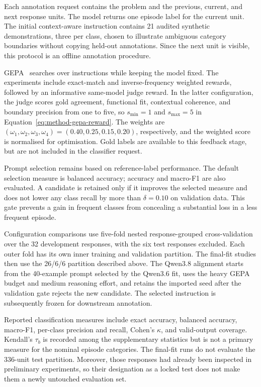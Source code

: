 \documentclass[12pt,a4paper,twoside,openright]{book}
\begin{document}
Each annotation request contains the problem and the previous, current, and
next response units. The model returns one episode label for the current
unit. The initial context-aware instruction contains 21 audited synthetic
demonstrations, three per class, chosen to illustrate ambiguous category
boundaries without copying held-out annotations. Since the next unit is
visible, this protocol is an offline annotation procedure.

GEPA~\cite{agrawal2026gepa} searches over instructions while keeping the model
fixed. The experiments include exact-match and
inverse-frequency weighted rewards, followed by an informative same-model
judge reward. In the latter configuration, the judge scores gold agreement,
functional fit, contextual coherence, and boundary precision from one to
five, so $s_{\min}=1$ and $s_{\max}=5$ in
Equation~\ref{eq:method-gepa-reward}. The weights are
$(\omega_1,\omega_2,\omega_3,\omega_4)=(0.40,0.25,0.15,0.20)$,
respectively, and the weighted score is normalised for optimisation.
Gold labels are available to
this feedback stage, but are not included in the classifier request.

Prompt selection remains based on reference-label performance. The default
selection measure is balanced accuracy; accuracy and macro-F1 are also
evaluated. A candidate is retained only if it improves the selected measure
and does not lower any class recall by more than $\delta=0.10$ on validation data.
This gate prevents a gain in frequent classes from concealing a substantial
loss in a less frequent episode.

Configuration comparisons use five-fold nested response-grouped
cross-validation over the 32 development responses, with the six test
responses excluded. Each outer fold has its own inner training and
validation partition. The final-fit studies then use the 26/6/6 partition
described above. The Qwen3.8 alignment starts from the 40-example
prompt selected by the Qwen3.6 fit, uses the heavy GEPA budget and
medium reasoning effort, and retains the imported seed after the validation
gate rejects the new candidate. The selected instruction is subsequently
frozen for downstream annotation.

Reported classification measures include exact accuracy, balanced accuracy,
macro-F1, per-class precision and recall, Cohen's $\kappa$, and valid-output
coverage. Kendall's $\tau_b$ is recorded among the supplementary statistics but is not
a primary measure for the nominal episode categories. The final-fit runs do
not evaluate the 336-unit test partition. Moreover, those responses had
already been inspected in preliminary experiments, so their designation as
a locked test does not make them a newly untouched evaluation set.
\end{document}
